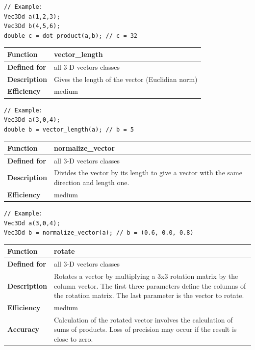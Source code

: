 \documentclass[11pt,a4paper,oneside,openright]{report}
\newcommand{\vspacesmall}{\vspace{3mm}}
\newcommand{\vspacebig}{\vspace{6mm}}
\begin{document}
\begin{lstlisting}[frame=none]
// Example:
Vec3Dd a(1,2,3);
Vec3Dd b(4,5,6);
double c = dot_product(a,b); // c = 32
\end{lstlisting}
\vspacebig


\begin{tabular}{|p{25mm}|p{100mm}|}
\hline
\bfseries Function & vector\_length \\ \hline
\bfseries Defined for & all 3-D vectors classes  \\ \hline
\bfseries Description & Gives the length of the vector (Euclidian norm) \\ \hline
\bfseries Efficiency & medium \\ \hline
\end{tabular}
\vspacesmall

\begin{lstlisting}[frame=none]
// Example:
Vec3Dd a(3,0,4);
double b = vector_length(a); // b = 5
\end{lstlisting}
\vspacebig


\begin{tabular}{|p{25mm}|p{100mm}|}
\hline
\bfseries Function & normalize\_vector \\ \hline
\bfseries Defined for & all 3-D vectors classes  \\ \hline
\bfseries Description & Divides the vector by its length to give a vector with the same direction and length one. \\ \hline
\bfseries Efficiency & medium \\ \hline
\end{tabular}
\vspacesmall

\begin{lstlisting}[frame=none]
// Example:
Vec3Dd a(3,0,4);
Vec3Dd b = normalize_vector(a); // b = (0.6, 0.0, 0.8)
\end{lstlisting}
\vspacebig


\begin{tabular}{|p{25mm}|p{100mm}|}
\hline
\bfseries Function & rotate \\ \hline
\bfseries Defined for & all 3-D vectors classes  \\ \hline
\bfseries Description & Rotates a vector by multiplying a 3x3 rotation matrix by the column vector. The first three parameters define the columns of the rotation matrix. The last parameter is the vector to rotate. \\ \hline
\bfseries Efficiency & medium \\ \hline
\bfseries Accuracy & Calculation of the rotated vector involves the calculation of sums of products. Loss of precision may occur if the result is close to zero. \\ \hline
\end{tabular}
\vspacesmall
\end{document}
